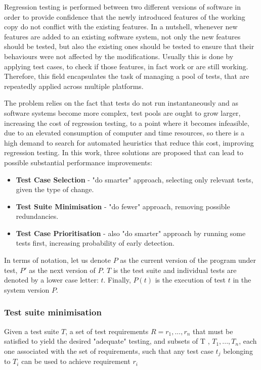 Regression testing is performed between two different versions of software in order to provide confidence that the newly introduced features of the working copy do not conflict with the existing features.
In a nutshell, whenever new features are added to an existing software system, not only the new features should be tested, but also the existing ones should be tested to ensure that their behaviours were not affected by the modifications. Usually this is done by applying test cases, to check if those features, in fact work or are still working. Therefore, this field encapsulates the task of managing a pool of tests, that are repeatedly applied across multiple platforms. \cite{ShinThesis} 
\par The problem relies on the fact that tests do not run instantaneously and as software systems become more complex, test pools are ought to grow larger, increasing the cost of regression testing, to a point where it becomes infeasible, due to an elevated consumption of computer and time resources, so there is a high demand to search for automated heuristics that reduce this cost, improving regression testing. In this work, three solutions are proposed that can lead to possible substantial performance improvements:

\begin{itemize}
	\item \textbf{Test Case Selection} - "do smarter" approach, selecting only relevant tests, given the type of change.
	\item \textbf{Test Suite Minimisation} - "do fewer" approach, removing possible redundancies.
	\item \textbf{Test Case Prioritisation} - also "do smarter" approach by running some tests first, increasing probability of early detection. \cite{ShinThesis}
\end{itemize}

In terms of notation, let us denote $P$ as the current version of the program under test, $P'$ as the next
version of $P$. $T$ is the test suite and individual tests are denoted by a lower case letter: $t$. Finally, $P(t)$ is the execution of test $t$ in the system version $P$.


\subsubsection{Test suite minimisation}

\theoremstyle{definition}
\begin{definition}{}
	Given a test suite $T$, a set of test requirements $ R = {r_1, ..., r_n}$ that must be satisfied to yield the desired "adequate" testing, and subsets of T ,  ${T_1, ..., T_n}$, each one associated with the set of requirements, such that any test case $t_j$ belonging to $T_i$ can be used to achieve requirement $r_i$
\end{definition}

